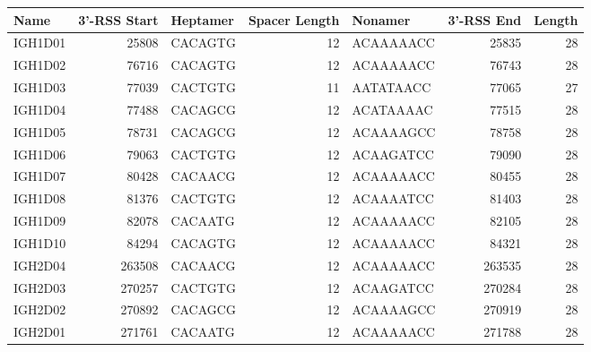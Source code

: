 \begin{tabular}{lrlrlrr}
  \toprule Name & 3'-RSS Start & Heptamer & Spacer Length & Nonamer & 3'-RSS End & Length \\ 
  \midrule IGH1D01 & 25808 & CACAGTG & 12 & ACAAAAACC & 25835 & 28 \\ 
  IGH1D02 & 76716 & CACAGTG & 12 & ACAAAAACC & 76743 & 28 \\ 
  IGH1D03 & 77039 & CACTGTG & 11 & AATATAACC & 77065 & 27 \\ 
  IGH1D04 & 77488 & CACAGCG & 12 & ACATAAAAC & 77515 & 28 \\ 
  IGH1D05 & 78731 & CACAGCG & 12 & ACAAAAGCC & 78758 & 28 \\ 
  IGH1D06 & 79063 & CACTGTG & 12 & ACAAGATCC & 79090 & 28 \\ 
  IGH1D07 & 80428 & CACAACG & 12 & ACAAAAACC & 80455 & 28 \\ 
  IGH1D08 & 81376 & CACTGTG & 12 & ACAAAATCC & 81403 & 28 \\ 
  IGH1D09 & 82078 & CACAATG & 12 & ACAAAAACC & 82105 & 28 \\ 
  IGH1D10 & 84294 & CACAGTG & 12 & ACAAAAACC & 84321 & 28 \\ 
  IGH2D04 & 263508 & CACAACG & 12 & ACAAAAACC & 263535 & 28 \\ 
  IGH2D03 & 270257 & CACTGTG & 12 & ACAAGATCC & 270284 & 28 \\ 
  IGH2D02 & 270892 & CACAGCG & 12 & ACAAAAGCC & 270919 & 28 \\ 
  IGH2D01 & 271761 & CACAATG & 12 & ACAAAAACC & 271788 & 28 \\ 
   \bottomrule \end{tabular}
